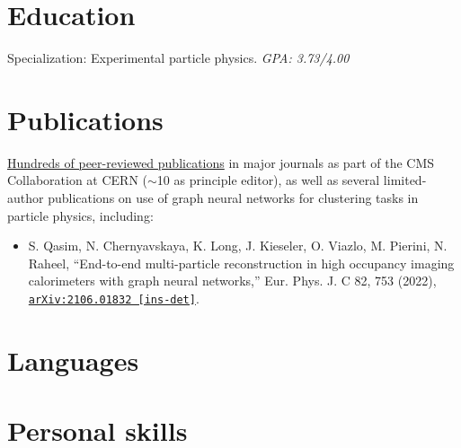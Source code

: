 \documentclass[9pt,a4paper]{moderncv}
\begin{document}
\section{Education}
{
    Specialization: Experimental particle physics.
    \normalsize \textit{GPA: 3.73/4.00} 
}

\pagebreak
\section{Publications}
\href{https://inspirehep.net/authors/1280606}{Hundreds of peer-reviewed publications} in major journals as part of the CMS Collaboration at CERN ($\sim$10 as principle editor), as well as several limited-author publications on use of graph neural networks for clustering tasks in particle physics, including:
\begin{itemize}
    \item S. Qasim, N. Chernyavskaya, K. Long, J. Kieseler, O. Viazlo, M. Pierini, N. Raheel, ``End-to-end multi-particle reconstruction in high occupancy imaging calorimeters with graph neural networks,'' Eur. Phys. J. C 82, 753 (2022), \href{https://arxiv.org/abs/2106.01832}{\texttt{arXiv:2106.01832 [ins-det]}}.
\end{itemize}

\section{Languages}

\section{Personal skills}
\end{document}
